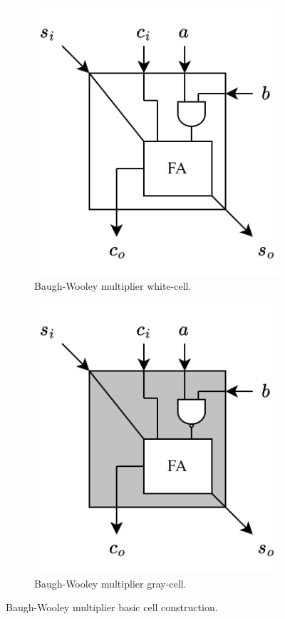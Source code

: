 \documentclass[../main.tex]{subfiles}
\begin{document}
\begin{figure}[h]
    \centering
    \begin{subfigure}{.5\textwidth}
        \centering
        \includegraphics[width=0.8\linewidth]{assets/bw_white_cell.png}
        \vspace{-10pt}
        \caption{Baugh-Wooley multiplier white-cell.}
        \label{fig:bw_white_cell}
    \end{subfigure}%
    \begin{subfigure}{.5\textwidth}
        \centering
        \includegraphics[width=0.8\linewidth]{assets/bw_gray_cell.png}
        \vspace{-10pt}
        \caption{Baugh-Wooley multiplier gray-cell.}
        \label{fig:bw_gray_cell}
    \end{subfigure}
    \vspace{-10pt}
    \caption{Baugh-Wooley multiplier basic cell construction.}
    \label{fig:bw_cell}
\end{figure}
\end{document}
